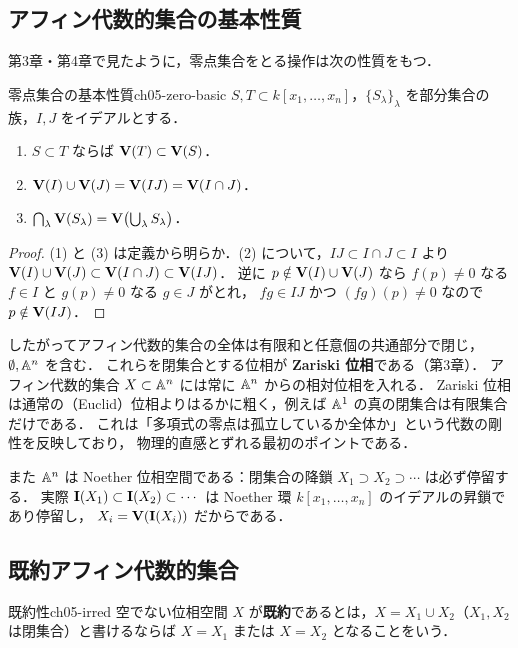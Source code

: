 \subsection{アフィン代数的集合の基本性質}

第3章・第4章で見たように，零点集合をとる操作は次の性質をもつ．

\begin{myprop}{零点集合の基本性質}{ch05-zero-basic}
$S,T\subset k[x_1,\dots,x_n]$，$\{S_\lambda\}_\lambda$ を部分集合の族，$I,J$ をイデアルとする．
\begin{enumerate}
  \item $S\subset T$ ならば $\mathbf{V}(T)\subset\mathbf{V}(S)$．
  \item $\mathbf{V}(I)\cup\mathbf{V}(J)=\mathbf{V}(IJ)=\mathbf{V}(I\cap J)$．
  \item $\bigcap_\lambda \mathbf{V}(S_\lambda)=\mathbf{V}\bigl(\bigcup_\lambda S_\lambda\bigr)$．
\end{enumerate}
\end{myprop}

\begin{proof}
(1) と (3) は定義から明らか．(2) について，$IJ\subset I\cap J\subset I$ より
$\mathbf{V}(I)\cup\mathbf{V}(J)\subset\mathbf{V}(I\cap J)\subset\mathbf{V}(IJ)$．
逆に $p\notin\mathbf{V}(I)\cup\mathbf{V}(J)$ なら $f(p)\ne0$ なる $f\in I$ と $g(p)\neq 0$ なる $g\in J$ がとれ，
$fg\in IJ$ かつ $(fg)(p)\ne0$ なので $p\notin\mathbf{V}(IJ)$．
\end{proof}

したがってアフィン代数的集合の全体は有限和と任意個の共通部分で閉じ，$\emptyset,\mathbb{A}^n$ を含む．
これらを閉集合とする位相が \textbf{Zariski 位相}である（第3章）．
アフィン代数的集合 $X\subset\mathbb{A}^n$ には常に $\mathbb{A}^n$ からの相対位相を入れる．
Zariski 位相は通常の（Euclid）位相よりはるかに粗く，例えば $\mathbb{A}^1$ の真の閉集合は有限集合だけである．
これは「多項式の零点は孤立しているか全体か」という代数の剛性を反映しており，
物理的直感とずれる最初のポイントである．

また $\mathbb{A}^n$ は Noether 位相空間である：閉集合の降鎖 $X_1\supset X_2\supset\cdots$ は必ず停留する．
実際 $\mathbf{I}(X_1)\subset\mathbf{I}(X_2)\subset\cdots$ は Noether 環 $k[x_1,\dots,x_n]$ のイデアルの昇鎖であり停留し，
$X_i=\mathbf{V}(\mathbf{I}(X_i))$ だからである．

\subsection{既約アフィン代数的集合}

\begin{mydef}{既約性}{ch05-irred}
空でない位相空間 $X$ が\textbf{既約}であるとは，$X=X_1\cup X_2$（$X_1,X_2$ は閉集合）と書けるならば
$X=X_1$ または $X=X_2$ となることをいう．
\end{mydef}

